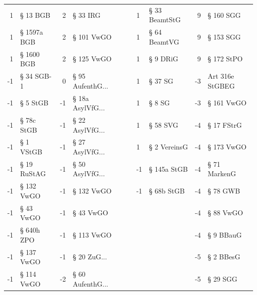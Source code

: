 \begin{tabular}{rlrlllllrl}
         1 &          § 13 BGB &           2 &            § 33 IRG &            &               &          1 &       § 33 BeamtStG &          9 &           § 160 SGG \\
         1 &       § 1597a BGB &           2 &          § 101 VwGO &            &               &          1 &        § 64 BeamtVG &          9 &           § 153 SGG \\
         1 &        § 1600 BGB &           2 &          § 125 VwGO &            &               &          1 &            § 9 DRiG &          9 &          § 172 StPO \\
        -1 &        § 34 SGB-1 &           0 &  § 95 AufenthG... &            &               &          1 &             § 37 SG &         -3 &     Art 316e StGBEG \\
        -1 &          § 5 StGB &          -1 &  § 18a AsylVfG... &            &               &          1 &              § 8 SG &         -3 &          § 161 VwGO \\
        -1 &        § 78c StGB &          -1 &   § 22 AsylVfG... &            &               &          1 &            § 58 SVG &         -4 &          § 17 FStrG \\
        -1 &         § 1 VStGB &          -1 &   § 27 AsylVfG... &            &               &          1 &        § 2 VereinsG &         -4 &          § 173 VwGO \\
        -1 &       § 19 RuStAG &          -1 &   § 50 AsylVfG... &            &               &         -1 &         § 145a StGB &         -4 &        § 71 MarkenG \\
        -1 &        § 132 VwGO &          -1 &          § 132 VwGO &            &               &         -1 &          § 68b StGB &         -4 &            § 78 GWB \\
        -1 &         § 43 VwGO &          -1 &           § 43 VwGO &            &               &            &                     &         -4 &           § 88 VwGO \\
        -1 &        § 640h ZPO &          -1 &          § 113 VwGO &            &               &            &                     &         -4 &           § 9 BBauG \\
        -1 &        § 137 VwGO &          -1 &       § 20 ZuG... &            &               &            &                     &         -5 &           § 2 BBesG \\
        -1 &        § 114 VwGO &          -2 &  § 60 AufenthG... &            &               &            &                     &         -5 &            § 29 SGG \\

\end{tabular}
